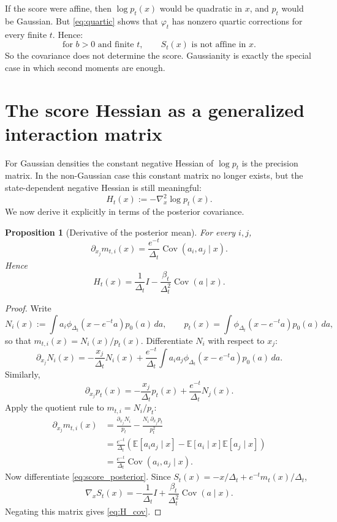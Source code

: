 \documentclass[11pt]{article}
\newtheorem{proposition}{Proposition}[section]
\newcommand{\E}{\mathbb{E}}
\newcommand{\Cov}{\operatorname{Cov}}
\newcommand{\Id}{I}
\begin{document}
If the score were affine, then $\log p_t(x)$ would be quadratic in $x$, and $p_t$ would be Gaussian. But \eqref{eq:quartic} shows that $\varphi_t$ has nonzero quartic corrections for every finite $t$. Hence:
\begin{equation}\label{eq:not_affine}
\text{for }b>0\text{ and finite }t,\qquad S_t(x)\text{ is not affine in }x.
\end{equation}
So the covariance does not determine the score. Gaussianity is exactly the special case in which second moments are enough.

\section{The score Hessian as a generalized interaction matrix}
For Gaussian densities the constant negative Hessian of $\log p_t$ is the precision matrix. In the non-Gaussian case this constant matrix no longer exists, but the state-dependent negative Hessian is still meaningful:
\begin{equation}\label{eq:H_def}
H_t(x):=-\nabla_x^2\log p_t(x).
\end{equation}
We now derive it explicitly in terms of the posterior covariance.

\begin{proposition}[Derivative of the posterior mean]\label{prop:post_mean_deriv}
For every $i,j$,
\begin{equation}\label{eq:post_mean_deriv}
\partial_{x_j}m_{t,i}(x)=\frac{e^{-t}}{\Delta_t}\Cov(a_i,a_j\mid x).
\end{equation}
Hence
\begin{equation}\label{eq:H_cov}
H_t(x)=\frac{1}{\Delta_t}\Id-\frac{\beta_t}{\Delta_t^2}\Cov(a\mid x).
\end{equation}
\end{proposition}

\begin{proof}
Write
\[
N_i(x):=\int a_i\phi_{\Delta_t}(x-e^{-t}a)p_0(a)\,da,
\qquad
p_t(x)=\int \phi_{\Delta_t}(x-e^{-t}a)p_0(a)\,da,
\]
so that $m_{t,i}(x)=N_i(x)/p_t(x)$. Differentiate $N_i$ with respect to $x_j$:
\[
\partial_{x_j}N_i(x)
=
-\frac{x_j}{\Delta_t}N_i(x)
+
\frac{e^{-t}}{\Delta_t}
\int a_i a_j\phi_{\Delta_t}(x-e^{-t}a)p_0(a)\,da.
\]
Similarly,
\[
\partial_{x_j}p_t(x)
=
-\frac{x_j}{\Delta_t}p_t(x)
+
\frac{e^{-t}}{\Delta_t}N_j(x).
\]
Apply the quotient rule to $m_{t,i}=N_i/p_t$:
\begin{align*}
\partial_{x_j}m_{t,i}(x)
&=
\frac{\partial_{x_j}N_i}{p_t}-\frac{N_i\,\partial_{x_j}p_t}{p_t^2} \\
&=
\frac{e^{-t}}{\Delta_t}
\left(
\E[a_i a_j\mid x]-\E[a_i\mid x]\E[a_j\mid x]
\right) \\
&=
\frac{e^{-t}}{\Delta_t}\Cov(a_i,a_j\mid x).
\end{align*}
Now differentiate \eqref{eq:score_posterior}. Since $S_t(x)=-x/\Delta_t+e^{-t}m_t(x)/\Delta_t$,
\[
\nabla_x S_t(x)=-\frac{1}{\Delta_t}\Id+\frac{\beta_t}{\Delta_t^2}\Cov(a\mid x).
\]
Negating this matrix gives \eqref{eq:H_cov}.
\end{proof}
\end{document}
